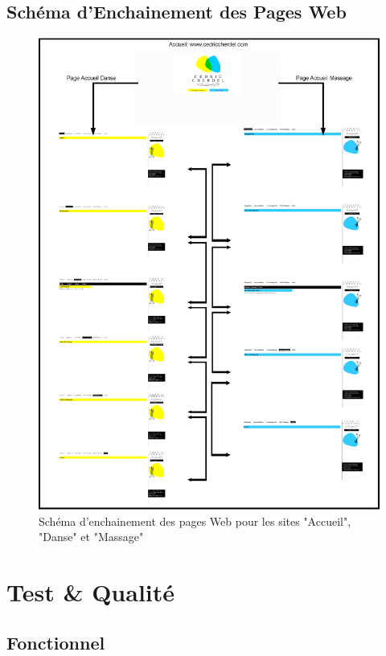 \documentclass[11pt,a4paper]{report}
\begin{document}
			\subsection{Schéma d'Enchainement des Pages Web}
				\begin{figure}[H]
					\centering
					\includegraphics[width=17.5cm]{Schema-Enchainement-Pages.eps}
					\caption[Schéma d'enchainement des Pages Web]{Schéma d'enchainement des pages Web pour les sites "Accueil", "Danse" et "Massage"}
					\label{fig:Enchainement-Pages}
				\end{figure}

	\section{Test \& Qualité}
		\subsection{Fonctionnel}
\end{document}
